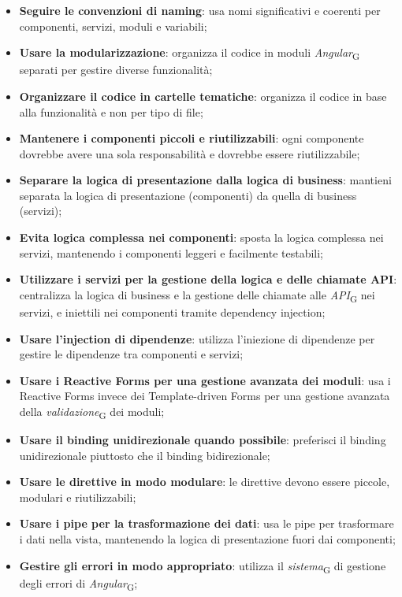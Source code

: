\begin{itemize}
    \item \textbf{Seguire le convenzioni di naming}: usa nomi significativi e coerenti per componenti, servizi, moduli e variabili;
    \item \textbf{Usare la modularizzazione}: organizza il codice in moduli \textit{Angular}\textsubscript{G} separati per gestire diverse funzionalità;
    \item \textbf{Organizzare il codice in cartelle tematiche}: organizza il codice in base alla funzionalità e non per tipo di file;
    \item \textbf{Mantenere i componenti piccoli e riutilizzabili}: ogni componente dovrebbe avere una sola responsabilità e dovrebbe essere riutilizzabile;
    \item \textbf{Separare la logica di presentazione dalla logica di business}: mantieni separata la logica di presentazione (componenti) da quella di business (servizi);
    \item \textbf{Evita logica complessa nei componenti}: sposta la logica complessa nei servizi, mantenendo i componenti leggeri e facilmente testabili;
    \item \textbf{Utilizzare i servizi per la gestione della logica e delle chiamate API}: centralizza la logica di business e la gestione delle chiamate alle \textit{API}\textsubscript{G} nei servizi, e iniettili nei componenti tramite dependency injection;
    \item \textbf{Usare l'injection di dipendenze}: utilizza l'iniezione di dipendenze per gestire le dipendenze tra componenti e servizi;
    \item \textbf{Usare i Reactive Forms per una gestione avanzata dei moduli}: usa i Reactive Forms invece dei Template-driven Forms per una gestione avanzata della \textit{validazione}\textsubscript{G} dei moduli;
    \item \textbf{Usare il binding unidirezionale quando possibile}: preferisci il binding unidirezionale piuttosto che il binding bidirezionale;
    \item \textbf{Usare le direttive in modo modulare}: le direttive devono essere piccole, modulari e riutilizzabili;
    \item \textbf{Usare i pipe per la trasformazione dei dati}: usa le pipe per trasformare i dati nella vista, mantenendo la logica di presentazione fuori dai componenti;
    \item \textbf{Gestire gli errori in modo appropriato}: utilizza il \textit{sistema}\textsubscript{G} di gestione degli errori di \textit{Angular}\textsubscript{G};

\end{itemize}
